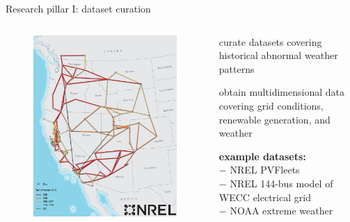 \documentclass[aspectratio=169,11pt]{beamer}
\begin{document}
\begin{frame}{Research pillar I: dataset curation}
\begin{columns}
	\begin{column}{0.42\textwidth}
		\begin{figure}
			\centering
			\includegraphics[width=\columnwidth]{./figures/weccmap.jpg}
		\end{figure}
	\end{column}
	\begin{column}{0.58\textwidth}
		\BIT
		\item curate datasets covering historical abnormal weather patterns
		\item obtain multidimensional data covering grid conditions, renewable generation, and weather
		\item \textbf{example datasets:} \\
		\hspace{12mm} $-$ NREL PVFleets \\
		\hspace{12mm} $-$ NREL 144-bus model of WECC electrical grid\\
		\hspace{12mm} $-$ NOAA extreme weather\\
		\EIT
	\end{column}
\end{columns}
\end{frame}
\end{document}
